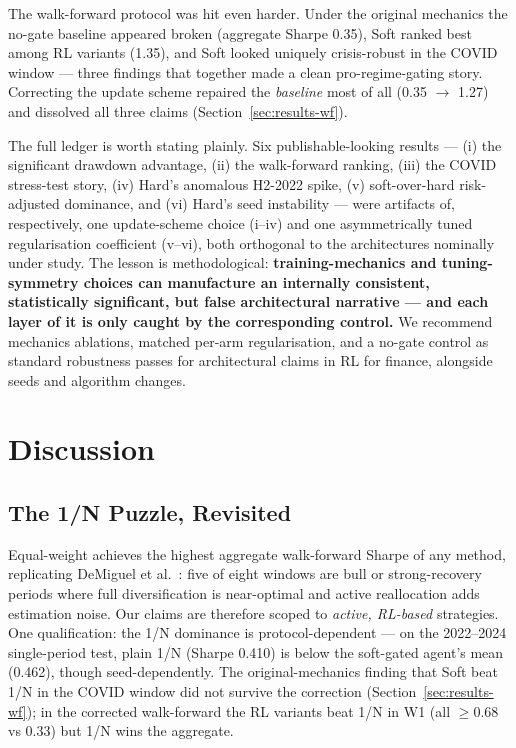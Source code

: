 \documentclass[sigconf,anonymous,review]{acmart}
\begin{document}
The walk-forward protocol was hit even harder. Under the original
mechanics the no-gate baseline appeared broken (aggregate Sharpe 0.35),
Soft ranked best among RL variants (1.35), and Soft looked uniquely
crisis-robust in the COVID window --- three findings that together made
a clean pro-regime-gating story. Correcting the update scheme repaired
the \emph{baseline} most of all (0.35 $\rightarrow$ 1.27) and dissolved
all three claims (Section~\ref{sec:results-wf}).

The full ledger is worth stating plainly. Six publishable-looking
results --- (i) the significant drawdown advantage, (ii) the
walk-forward ranking, (iii) the COVID stress-test story, (iv) Hard's
anomalous H2-2022 spike, (v) soft-over-hard risk-adjusted dominance,
and (vi) Hard's seed instability --- were artifacts of, respectively,
one update-scheme choice (i--iv) and one asymmetrically tuned
regularisation coefficient (v--vi), both orthogonal to the
architectures nominally under study. The lesson is methodological:
\textbf{training-mechanics and tuning-symmetry choices can manufacture
an internally consistent, statistically significant, but false
architectural narrative --- and each layer of it is only caught by the
corresponding control.} We recommend mechanics ablations, matched
per-arm regularisation, and a no-gate control as standard robustness
passes for architectural claims in RL for finance, alongside seeds and
algorithm changes.

\section{Discussion}

\subsection{The 1/N Puzzle, Revisited}
Equal-weight achieves the highest aggregate walk-forward Sharpe of any
method, replicating DeMiguel et al.~\cite{demiguel2009}: five of eight
windows are bull or strong-recovery periods where full diversification
is near-optimal and active reallocation adds estimation noise. Our
claims are therefore scoped to \emph{active, RL-based} strategies. One
qualification: the 1/N dominance is protocol-dependent --- on the
2022--2024 single-period test, plain 1/N (Sharpe 0.410) is below the
soft-gated agent's mean (0.462), though seed-dependently. The
original-mechanics finding that Soft beat 1/N in the COVID window did
not survive the correction (Section~\ref{sec:results-wf}); in the
corrected walk-forward the RL variants beat 1/N in W1 (all ${\geq}0.68$
vs 0.33) but 1/N wins the aggregate.
\end{document}
